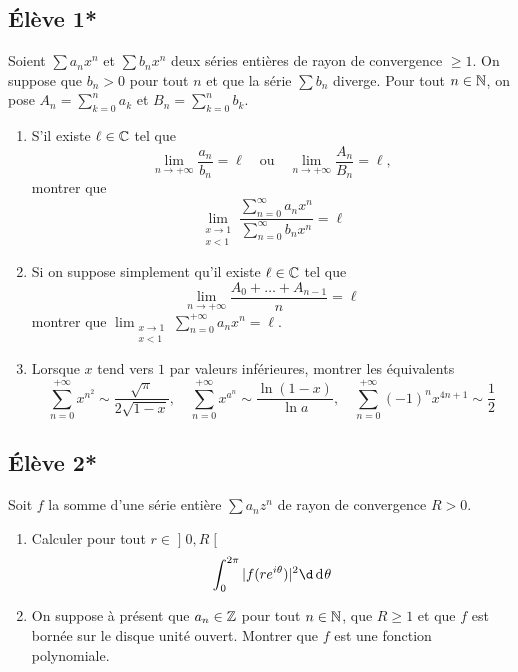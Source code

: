 \documentclass[10pt]{scrartcl}
\title{}
\author{}
\date{}
\begin{document}
    
    \subsection*{Élève 1*}
    \begin{exo}
        Soient $\sum a_n x^n$ et $\sum b_n x^n$ deux séries entières de rayon de convergence $\geq 1$.
        On suppose que $b_n>0$ pour tout $n$ et que la série $\sum b_n$ diverge. 
        Pour tout $n\in\operatorname{\mathbb N}$, on pose $A_n=\sum_{k=0}^na_k$ et $B_n=\sum_{k=0}^nb_k$. 
        \begin{enumerate}
            \item S'il existe $\ell\in\operatorname{\mathbb C}$ tel que 
            \[
                \lim_{n\to+\infty}\frac{a_n}{b_n}=\ell\quad\text{ou}\quad\lim_{n\to+\infty}\frac{A_n}{B_n}=\ell,
            \]
            montrer que 
            \[
                \lim_{\begin{smallmatrix}x\to 1\\ x < 1\end{smallmatrix}}\frac{\sum_{n=0}^\infty a_nx^n}{\sum_{n=0}^\infty b_nx^n}=\ell
            \]
            \item Si on suppose simplement qu'il existe $\ell\in\operatorname{\mathbb C}$ tel que 
            \[
                \lim_{n\to+\infty}\frac{A_0+\dots+A_{n-1}}n=\ell
            \]
            montrer que $\lim_{\begin{smallmatrix}x\to 1\\ x < 1\end{smallmatrix}}\sum_{n=0}^{+\infty}a_nx^n=\ell$.
            \item Lorsque $x$ tend vers $1$ par valeurs inférieures, montrer les équivalents
            \[
                \sum_{n=0}^{+\infty}x^{n^2}\sim\frac{\sqrt\pi}{2\sqrt{1-x}},\quad 
                \sum_{n=0}^{+\infty}x^{a^n}\sim\frac{\ln(1-x)}{\ln a},\quad
                \sum_{n=0}^{+\infty}(-1)^nx^{4n+1}\sim\frac12
            \]
        \end{enumerate}
    \end{exo}

    \subsection*{Élève 2*}
    \begin{exo} Soit $f$ la somme d'une série entière $\sum a_nz^n$ de rayon de convergence $R > 0$. 
        \begin{enumerate}
            \item Calculer pour tout $r\in\mathopen]0,R\mathclose[$
            \[
                \int_{0}^{2\pi}|f(re^{i\theta})|^2\d\dd \theta
            \]
            \item On suppose à présent que $a_n\in\operatorname{\mathbb Z}$ pour tout $n\in\operatorname{\mathbb N}$, que $R\geq 1$ et que $f$ est bornée sur le disque unité ouvert.
            Montrer que $f$ est une fonction polynomiale.
        \end{enumerate}
    \end{exo}
\end{document}
